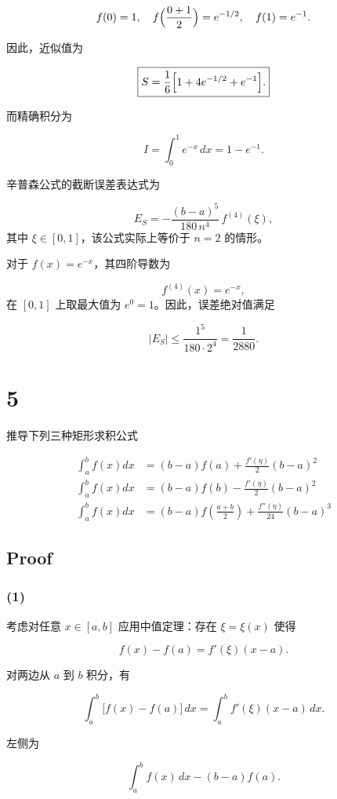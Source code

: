 \documentclass[11pt]{article}
\begin{document}
\[
f(0)=1,\quad f\Bigl(\frac{0+1}{2}\Bigr)= e^{-1/2},\quad f(1)=e^{-1}.
\]

因此，近似值为

\[\boxed{
S=\frac{1}{6}\Bigl[ 1 + 4e^{-1/2} + e^{-1}\Bigr].}
\]

而精确积分为

\[
I=\int_0^1 e^{-x}\,dx = 1 - e^{-1} .
\]

辛普森公式的截断误差表达式为

\[
E_S=-\frac{(b-a)^5}{180\,n^4}\,f^{(4)}(\xi),
\] 其中 \(\xi\in[0,1]\)，该公式实际上等价于 \(n=2\) 的情形。

对于 \(f(x)=e^{-x}\)，其四阶导数为

\[
f^{(4)}(x)=e^{-x},
\] 在 \([0,1]\) 上取最大值为 \(e^0=1\)。因此，误差绝对值满足

\[\boxed{
\lvert E_S \rvert \le \frac{1^5}{180\cdot 2^4} = \frac{1}{2880}.}
\]

    \section{5}\label{section}

推导下列三种矩形求积公式

\[
\begin{aligned}
\int_a^b f(x) dx &= (b - a) f(a) + \frac{f'(\eta)}{2}(b - a)^2 \\
\int_a^b f(x) dx &= (b - a) f(b) - \frac{f'(\eta)}{2}(b - a)^2 \\
\int_a^b f(x) dx &= (b - a) f\left(\frac{a + b}{2}\right) + \frac{f''(\eta)}{24}(b - a)^3
\end{aligned}
\]

\subsection{Proof}\label{proof}

\subsubsection{(1)}\label{section-1}

考虑对任意 \(x\in[a,b]\) 应用中值定理：存在 \(\xi=\xi(x)\) 使得

\[
f(x)-f(a)=f'(\xi)(x-a).
\]

对两边从 \(a\) 到 \(b\) 积分，有

\[
\int_a^b \bigl[f(x)-f(a)\bigr]\,dx = \int_a^b f'(\xi)(x-a)\,dx.
\]

左侧为

\[
\int_a^b f(x)\,dx - (b-a)f(a).
\]
\end{document}
